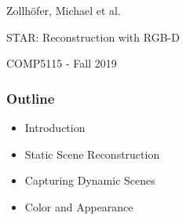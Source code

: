 \begin{frame}

\begin{center}
{\Large Zollh\"ofer, Michael et al.

STAR: Reconstruction with RGB-D}

COMP5115 - Fall 2019
\end{center}
\end{frame}

\begin{frame}
\frametitle{Outline}

\begin{itemize}
\item Introduction
\item Static Scene Reconstruction
\item Capturing Dynamic Scenes
\item Color and Appearance
\end{itemize}

\end{frame}
